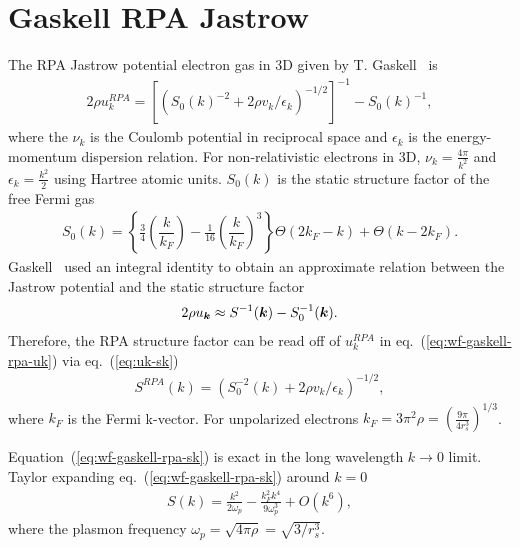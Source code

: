 \section{Gaskell RPA Jastrow}
\label{sec:gaskell-rpa-jas}
The RPA Jastrow potential electron gas in 3D given by T. Gaskell~\cite{Gaskell1961, Ceperley1978, Holzmann2009, Holzmann2016} is
\begin{align}
2\rho u^{RPA}_k = \left[\left( S_0(k)^{-2} + 2\rho v_k/\epsilon_k \right)^{-1/2} \right] ^{-1} - S_0(k)^{-1}, \label{eq:wf-gaskell-rpa-uk}
\end{align}
where the $\nu_k$ is the Coulomb potential in reciprocal space and $\epsilon_k$ is the energy-momentum dispersion relation. For non-relativistic electrons in 3D, $\nu_k=\frac{4\pi}{k^2}$ and $\epsilon_k=\frac{k^2}{2}$ using Hartree atomic units. $S_0(k)$ is the static structure factor of the free Fermi gas ~\cite{Gori-Giorgi2000}
\begin{align}
S_0(k) = \left\{
\frac{3}{4}\left( \dfrac{k}{k_F} \right) - \frac{1}{16}\left(\dfrac{k}{k_F}\right)^3\right\} \Theta(2k_F-k) + \Theta(k-2k_F).
\end{align}
Gaskell~\cite{Gaskell1961} used an integral identity to obtain an approximate relation between the Jastrow potential and the static structure factor%
\begin{align}
2\rho u_{\boldsymbol{k}} \approx S^{-1}(\boldsymbol{k}) - S^{-1}_0(\boldsymbol{k}). \label{eq:uk-sk}
\end{align}
Therefore, the RPA structure factor can be read off of $u^{RPA}_k$ in eq.~(\ref{eq:wf-gaskell-rpa-uk}) via eq.~(\ref{eq:uk-sk})
\begin{align}
S^{RPA}(k) = \left( S_0^{-2}(k) + 2\rho v_k/\epsilon_k \right)^{-1/2}, \label{eq:wf-gaskell-rpa-sk}
\end{align}
where $k_F$ is the Fermi k-vector. For unpolarized electrons $k_F=3\pi^2\rho=\left(\frac{9\pi}{4r_s^3}\right)^{1/3}$.

Equation~(\ref{eq:wf-gaskell-rpa-sk}) is exact in the long wavelength $k\rightarrow0$ limit. Taylor expanding eq.~(\ref{eq:wf-gaskell-rpa-sk}) around $k=0$
\begin{align} \label{eq:wf-gaskell-rpa-sk-taylor}
S(k) = \frac{k^2}{2\omega_p}-\frac{k_F^2k^4}{9 \omega_p ^3}+O\left(k^6\right),
\end{align}
where the plasmon frequency $\omega_p=\sqrt{4\pi\rho}=\sqrt{3/r_s^3}$.

